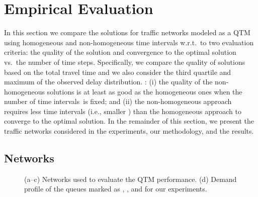 \section{Empirical Evaluation}
  
In this section we compare the solutions for traffic networks modeled as a QTM
using homogeneous and non-homogeneous time intervals w.r.t.\ to two evaluation criteria:
%
the quality of the solution and convergence to the optimal solution vs.\ the number
of time steps.
%
%
Specifically, we compare the quality of solutions based on the total travel time and we also
consider the third quartile and maximum of the observed delay distribution.
%
%
%
:
%
(i) the quality of the non-homogeneous solutions is at least as good as the
homogeneous ones when the number of time intervals~\Nn is fixed; and 
%
(ii) the non-homogeneous approach requires less time intervals (i.e., smaller
\Nn) than the homogeneous approach to converge to the optimal solution.
%
In the remainder of this section, we present the traffic networks considered in
the experiments, our methodology, and the results.



\subsection{Networks}



\begin{figure*}[t!]
\centering
\caption{(a--c) Networks used to evaluate the QTM performance.
%
(d) Demand profile of the queues marked as \qLowTraf,
\qHighTraf, and \qVarTraf for our experiments.}
\label{fig:networks}
\end{figure*}



